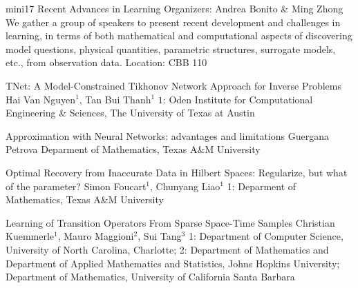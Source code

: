\mini
{mini17}
{Recent Advances in Learning}
{Organizers: Andrea Bonito \& Ming Zhong}
{We gather a group of speakers to present recent development and challenges in learning, in terms of both mathematical and computational aspects of discovering model questions, physical quantities, parametric structures, surrogate models, etc., from observation data. }
{Location: CBB 110}

\begin{talks}
\item\talk
{TNet: A Model-Constrained Tikhonov Network Approach for Inverse Problems}
{Hai Van Nguyen$^1$, Tan Bui Thanh$^1$}
{$1$: Oden Institute for Computational Engineering \& Sciences, The University of Texas at Austin}
\item\talk
{Approximation with Neural Networks: advantages and limitations}
{Guergana Petrova}
{Deparment of Mathematics, Texas A\&M University}
\item\talk
{Optimal Recovery from Inaccurate Data in Hilbert Spaces: Regularize, but what of the parameter?}
{Simon Foucart$^1$, Chunyang Liao$^1$}
{1: Deparment of Mathematics, Texas A\&M University}
\item\talk
{Learning of Transition Operators From Sparse Space-Time Samples}
{Christian Kuemmerle$^1$, Mauro Maggioni$^2$, Sui Tang$^3$}
{1: Department of Computer Science, University of North Carolina, Charlotte; 2: Department of Mathematics and Department of Applied Mathematics and Statistics, Johns Hopkins University; Department of Mathematics, University of California Santa Barbara}
\end{talks}
\room
